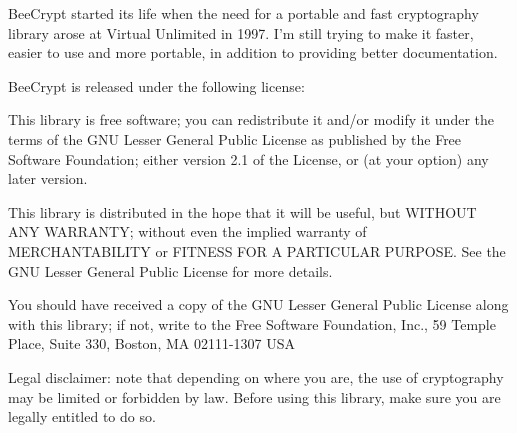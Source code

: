 Bee\-Crypt started its life when the need for a portable and fast cryptography library arose at Virtual Unlimited in 1997. I'm still trying to make it faster, easier to use and more portable, in addition to providing better documentation.

Bee\-Crypt is released under the following license:

This library is free software; you can redistribute it and/or modify it under the terms of the GNU Lesser General Public License as published by the Free Software Foundation; either version 2.1 of the License, or (at your option) any later version.

This library is distributed in the hope that it will be useful, but WITHOUT ANY WARRANTY; without even the implied warranty of MERCHANTABILITY or FITNESS FOR A PARTICULAR PURPOSE. See the GNU Lesser General Public License for more details.

You should have received a copy of the GNU Lesser General Public License along with this library; if not, write to the Free Software Foundation, Inc., 59 Temple Place, Suite 330, Boston, MA 02111-1307 USA

Legal disclaimer: note that depending on where you are, the use of cryptography may be limited or forbidden by law. Before using this library, make sure you are legally entitled to do so.


